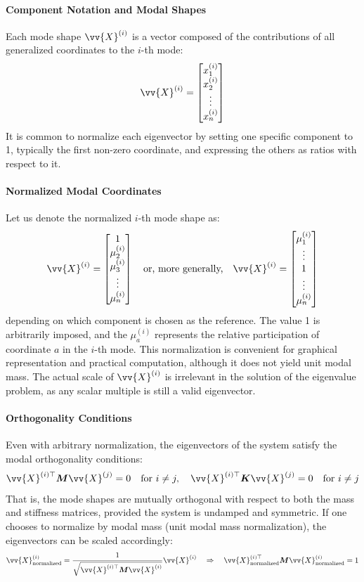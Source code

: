 \paragraph{Component Notation and Modal Shapes} Each mode shape \( \vv{X}^{(i)} \) is a vector composed of the contributions of all generalized coordinates to the \( i \)-th mode:
\[
\vv{X}^{(i)} = 
\begin{bmatrix}
x_1^{(i)} \\
x_2^{(i)} \\
\vdots \\
x_n^{(i)}
\end{bmatrix}
\]
It is common to normalize each eigenvector by setting one specific component to 1, typically the first non-zero coordinate, and expressing the others as ratios with respect to it.

\paragraph{Normalized Modal Coordinates} Let us denote the normalized \( i \)-th mode shape as:
\[
\vv{X}^{(i)} =
\begin{bmatrix}
1 \\
\mu_2^{(i)} \\
\mu_3^{(i)} \\
\vdots \\
\mu_n^{(i)}
\end{bmatrix}
\quad \text{or, more generally,} \quad
\vv{X}^{(i)} =
\begin{bmatrix}
\mu_1^{(i)} \\
\vdots \\
1 \\
\vdots \\
\mu_n^{(i)}
\end{bmatrix}
\]
depending on which component is chosen as the reference. The value 1 is arbitrarily imposed, and the \( \mu_a^{(i)} \) represents the relative participation of coordinate \( a \) in the \( i \)-th mode. This normalization is convenient for graphical representation and practical computation, although it does not yield unit modal mass. The actual scale of \( \vv{X}^{(i)} \) is irrelevant in the solution of the eigenvalue problem, as any scalar multiple is still a valid eigenvector.

\paragraph{Orthogonality Conditions} Even with arbitrary normalization, the eigenvectors of the system satisfy the modal orthogonality conditions:
\[
\vv{X}^{(i)\top} \boldsymbol{M} \vv{X}^{(j)} = 0 \quad \text{for } i \neq j,
\quad
\vv{X}^{(i)\top} \boldsymbol{K} \vv{X}^{(j)} = 0 \quad \text{for } i \neq j
\]
That is, the mode shapes are mutually orthogonal with respect to both the mass and stiffness matrices, provided the system is undamped and symmetric. If one chooses to normalize by modal mass (unit modal mass normalization), the eigenvectors can be scaled accordingly:
\[
\vv{X}^{(i)}_{\text{normalized}} = \frac{1}{\sqrt{\vv{X}^{(i)\top} \boldsymbol{M} \vv{X}^{(i)}}}  \vv{X}^{(i)}
\quad \Rightarrow \quad
\vv{X}^{(i)\top}_{\text{normalized}} \boldsymbol{M} \vv{X}^{(i)}_{\text{normalized}} = 1
\]

